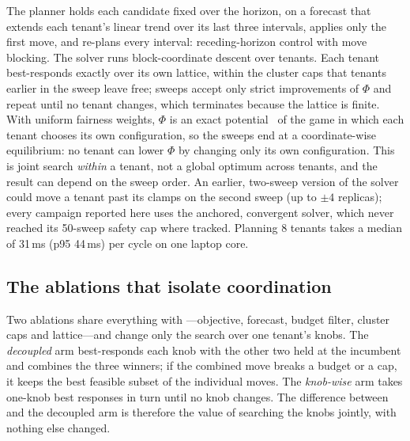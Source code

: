The planner holds each candidate fixed over the horizon, on a forecast that
extends each tenant's linear trend over its last three intervals, applies
only the first move, and re-plans every interval: receding-horizon control
with move blocking. The solver runs block-coordinate descent over tenants.
Each tenant best-responds exactly over its own lattice, within the cluster
caps that tenants earlier in the sweep leave free; sweeps accept only
strict improvements of $\Phi$ and repeat until no tenant changes, which
terminates because the lattice is finite. With uniform fairness weights,
$\Phi$ is an exact potential~\cite{monderer1996} of the game in which each
tenant chooses its own configuration, so the sweeps end at a
coordinate-wise equilibrium: no tenant can lower $\Phi$ by changing only its
own configuration. This is joint search \emph{within} a tenant, not a
global optimum across tenants, and the result can depend on the sweep
order. An earlier, two-sweep version of the solver could move a tenant past
its clamps on the second sweep (up to $\pm4$ replicas); every campaign
reported here uses the anchored, convergent solver, which never reached its
50-sweep safety cap where tracked. Planning 8 tenants takes a median of
31\,ms (p95 44\,ms) per cycle on one laptop core.

\subsection{The ablations that isolate coordination}
\label{sec:ablations}

Two ablations share everything with \jcac{}---objective, forecast, budget
filter, cluster caps and lattice---and change only the search over one
tenant's knobs. The \emph{decoupled} arm best-responds each knob with the
other two held at the incumbent and combines the three winners; if the
combined move breaks a budget or a cap, it keeps the best feasible subset of
the individual moves. The \emph{knob-wise} arm takes one-knob best responses in turn
until no knob changes. The difference between \jcac{} and
the decoupled arm is therefore the value of searching the knobs jointly,
with nothing else changed.

